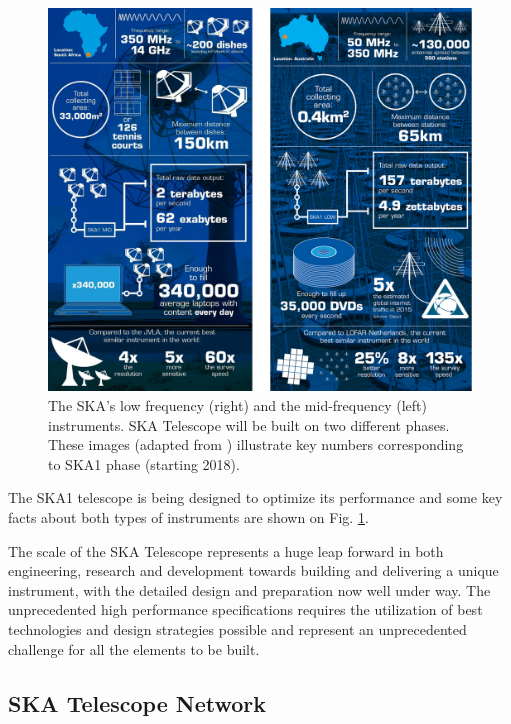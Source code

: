 \documentclass[review]{elsarticle}
\begin{document}
\begin{figure}[h]
	\includegraphics[scale=0.25]{img/ska_instruments}
	\caption{The SKA's low frequency (right) and the mid-frequency (left) instruments.  SKA Telescope will be built on two different phases. These images (adapted from \cite{ska:multimedia_rsrcs}) illustrate key numbers corresponding to SKA1 phase (starting 2018). }
	\label{fig:ska_instruments1}
\end{figure}

The SKA1 telescope is being designed to optimize its performance and some key facts about both types of instruments are shown on Fig. \ref{fig:ska_instruments1}. 

The scale of the SKA Telescope represents a huge leap forward in both engineering, research and development towards building and delivering a unique instrument, with the detailed design and preparation now well under way. The unprecedented high performance specifications requires the utilization of best technologies and design strategies possible and represent an unprecedented challenge for all the elements to be built. 

\subsection{SKA Telescope Network}
\end{document}
